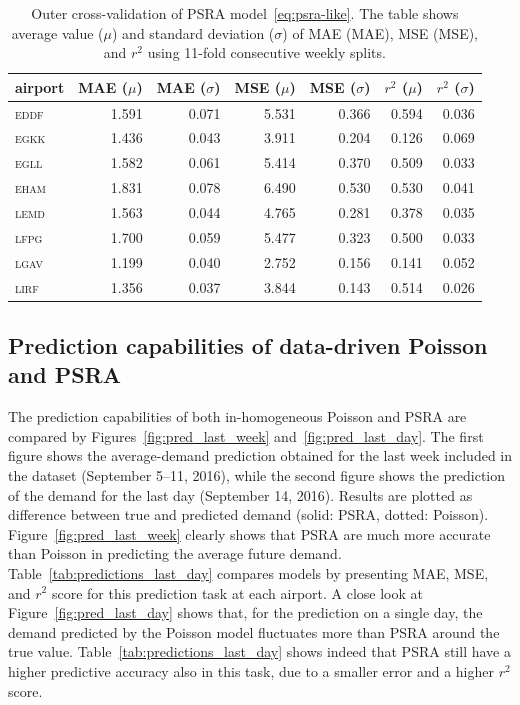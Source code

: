 \documentclass[draft,review]{elsarticle}
\newcommand{\airp}[1]{\textcolor{#1}{\textsc{#1}}}
\begin{document}
\begin{table}
  \caption{Outer cross-validation of \acs{PSRA} model~\eqref{eq:psra-like}. The table shows average value (\(\mu\)) and standard deviation (\(\sigma\)) of \acl{MAE} (\acs{MAE}), \acl{MSE} (\acs{MSE}), and \(r^2\) using 11-fold consecutive weekly splits.}
  \label{tab:outer_cv}
  \centering
  \begin{tabular}{lrrrrrr}
    \toprule
    airport &  \acs{MAE} (\(\mu\)) &  \acs{MAE} (\(\sigma\)) &  \acs{MSE} (\(\mu\)) &  \acs{MSE} (\(\sigma\)) &  \(r^2\) (\(\mu\)) &  \(r^2\) (\(\sigma\)) \\
    \midrule
    \airp{eddf} & 1.591 & 0.071 & 5.531 & 0.366 & 0.594 & 0.036 \\
    \airp{egkk} & 1.436 & 0.043 & 3.911 & 0.204 & 0.126 & 0.069 \\
    \airp{egll} & 1.582 & 0.061 & 5.414 & 0.370 & 0.509 & 0.033 \\
    \airp{eham} & 1.831 & 0.078 & 6.490 & 0.530 & 0.530 & 0.041 \\
    \airp{lemd} & 1.563 & 0.044 & 4.765 & 0.281 & 0.378 & 0.035 \\
    \airp{lfpg} & 1.700 & 0.059 & 5.477 & 0.323 & 0.500 & 0.033 \\
    \airp{lgav} & 1.199 & 0.040 & 2.752 & 0.156 & 0.141 & 0.052 \\
    \airp{lirf} & 1.356 & 0.037 & 3.844 & 0.143 & 0.514 & 0.026 \\
    \bottomrule
  \end{tabular}
\end{table}

\subsection{Prediction capabilities of data-driven Poisson and \acs{PSRA}}\label{sec:comparison}

The prediction capabilities of both in-homogeneous Poisson and \ac{PSRA} are compared by Figures~\ref{fig:pred_last_week} and~\ref{fig:pred_last_day}.
The first figure shows the average-demand prediction obtained for the last week included in the dataset (September 5--11, 2016), while the second figure shows the prediction of the demand for the last day (September 14, 2016).
Results are plotted as difference between true and predicted demand (solid: \ac{PSRA}, dotted: Poisson).
Figure~\ref{fig:pred_last_week} clearly shows that \ac{PSRA} are much more accurate than Poisson in predicting the average future demand.
Table~\ref{tab:predictions_last_day} compares models by presenting \ac{MAE}, \ac{MSE}, and \(r^2\) score for this prediction task at each airport.
A close look at Figure~\ref{fig:pred_last_day} shows that, for the prediction on a single day, the demand predicted by the Poisson model fluctuates more than \ac{PSRA} around the true value.
Table~\ref{tab:predictions_last_day} shows indeed that \ac{PSRA} still have a higher predictive accuracy also in this task, due to a smaller error and a higher \(r^2\) score.
\end{document}
